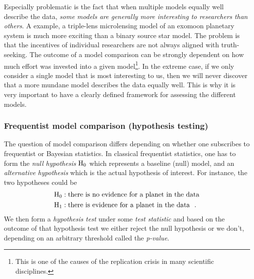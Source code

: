 \documentclass[12pt,dvipsnames]{report}
\newcommand{\hquad}{~~}
\begin{document}
Especially problematic is the fact that when multiple models equally well 
describe the data, \emph{some models are generally more interesting to researchers than others}.
A example, a triple-lens microlensing model of an exomoon planetary system is much more 
exciting than a binary source star model. 
The problem is that the incentives of individual researchers 
are not always aligned with truth-seeking. The outcome of a model 
comparison can be strongly dependent on how much effort was invested into 
a given model\footnote{This is one of the causes of the replication crisis in 
many scientific disciplines.}. In the extreme case, if we only consider a single model that is 
most interesting to us, then we will never discover that a more mundane 
model describes the data equally well. 
This is why it is very important to have a clearly defined framework for assessing 
the different models.

\subsubsection{Frequentist model comparison (hypothesis testing)}
The question of model comparison differs depending on whether
one subscribes to frequentist or Bayesian statistics. In classical frequentist
statistics, one has to form the \emph{null hypothesis} $\textrm H_0$ which 
represents a baseline (null) model, and an \emph{alternative hypothesis} which is 
the actual hypothesis of interest. For instance, the two hypotheses could be
\begin{align}
    \textrm H_0: & \; \textrm{there is no evidence for a planet in the data} \notag\\
    \textrm H_1: & \;\textrm{there is evidence for a planet in the data}\notag
    \hquad.
\end{align}
We then form a \emph{hypothesis test} under some \emph{test statistic} 
and based on the outcome of that hypothesis test we either reject the null 
hypothesis or we don't, depending on an arbitrary threshold called the 
\emph{p-value}.
\end{document}
